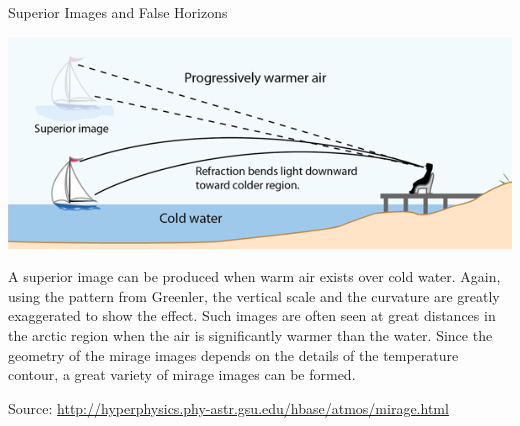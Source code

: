 \documentclass{beamer}
\begin{document}
\begin{frame}
\begin{block}{Superior Images and False Horizons \citep{Mirage-Greenler1980,AtmRefrac-Hyperphysics}}
\begin{center}\includegraphics[width=0.95\hsize]{miragesup.png}\end{center}
A superior image can be produced when warm air exists over cold water. Again, using the pattern from Greenler, the vertical scale and the curvature are greatly exaggerated to show the effect. Such images are often seen at great distances in the arctic region when the air is significantly warmer than the water. Since the geometry of the mirage images depends on the details of the temperature contour, a great variety of mirage images can be formed.

Source: \url{http://hyperphysics.phy-astr.gsu.edu/hbase/atmos/mirage.html}
\end{block}

\vfill

\begin{block}{\refname}
\renewcommand*{\bibfont}{\small}
\addtolength{\bibitemsep}{-0.5ex}
\setlength{\biblabelsep}{0.25em}
\printbibliography[heading=none]
\end{block}

\end{frame}
\end{document}
